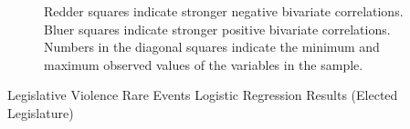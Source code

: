 \documentclass[a4paper]{article}\usepackage{graphicx, color}
\begin{document}
{{\begin{landscape}
\begin{figure}[t]
\begin{center}

    \end{center}
    \begin{singlespace}
        {\scriptsize{Redder squares indicate stronger negative bivariate correlations. \\
        Bluer squares indicate stronger positive bivariate correlations. \\
        Numbers in the diagonal squares indicate the minimum and maximum observed values of the variables in the sample.
        }}
    \end{singlespace} 
\end{figure}
\end{landscape}


\begin{landscape}
\begin{table}[htp]
    \caption{Legislative Violence Rare Events Logistic Regression Results (Elected Legislature)}
    \label{outputTable.dem}
    \vspace{0.25cm}
    {\tiny{
    \begin{center}


\end{center}}}
\end{table}
\end{landscape}}}
\end{document}
